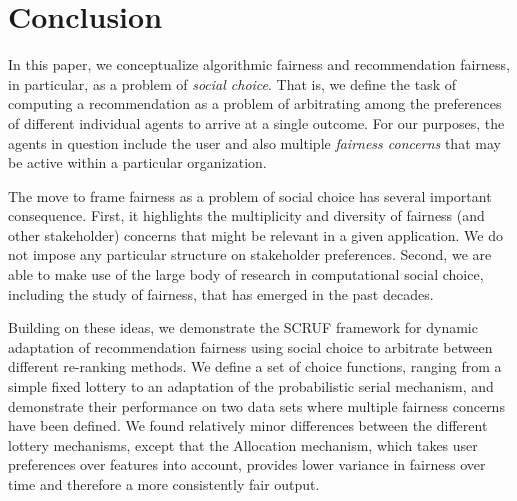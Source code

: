 \section{Conclusion}
In this paper, we conceptualize algorithmic fairness and recommendation fairness, in particular, as a problem of \textit{social choice}. That is, we define the task of computing a recommendation as a problem of arbitrating among the preferences of different individual agents to arrive at a single outcome. For our purposes, the agents in question include the user and also multiple \textit{fairness concerns} that may be active within a particular organization. 


The move to frame fairness as a problem of social choice has several important consequence. First, it highlights the multiplicity and diversity of fairness (and other stakeholder) concerns that might be relevant in a given application. We do not impose any particular structure on stakeholder preferences. Second, we are able to make use of the large body of research in computational social choice, including the study of fairness, that has emerged in the past decades. 

Building on these ideas, we demonstrate the SCRUF framework for dynamic adaptation of recommendation fairness using social choice to arbitrate between different re-ranking methods. We define a set of choice functions, ranging from a simple fixed lottery to an adaptation of the probabilistic serial mechanism, and demonstrate their performance on two data sets where multiple fairness concerns have been defined. We found relatively minor differences between the different lottery mechanisms, except that the Allocation mechanism, which takes user preferences over features into account, provides lower variance in fairness over time and therefore a more consistently fair output.
